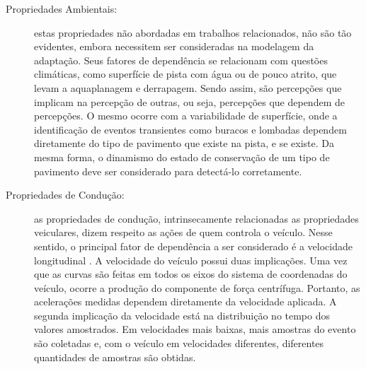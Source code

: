 \begin{description}
	\item [Propriedades Ambientais:] estas propriedades não abordadas em trabalhos relacionados, não são tão evidentes, embora necessitem ser consideradas na modelagem da adaptação. Seus fatores de dependência se relacionam com questões climáticas, como superfície de pista com água ou de pouco atrito, que levam a aquaplanagem e derrapagem. Sendo assim, são percepções que implicam na percepção de outras, ou seja, percepções que dependem de percepções. O mesmo ocorre com a variabilidade de superfície, onde a identificação de eventos transientes como buracos e lombadas dependem diretamente do tipo de pavimento que existe na pista, e se existe. Da mesma forma, o dinamismo do estado de conservação de um tipo de pavimento deve ser considerado para detectá-lo corretamente.

	\item [Propriedades de Condução:] as propriedades de condução, intrinsecamente relacionadas as propriedades veiculares, dizem respeito as ações de quem controla o veículo. Nesse sentido, o principal fator de dependência a ser considerado é a velocidade longitudinal \cite{Brunauer2016, Douangphachanh2013, Gueta2017, Kumar2017, Lima2016, M.2017, Nalavde2015, Singh2017}. A velocidade do veículo possui duas implicações. Uma vez que as curvas são feitas em todos os eixos do sistema de coordenadas do veículo, ocorre a produção do componente de força centrífuga. Portanto, as acelerações medidas dependem diretamente da velocidade aplicada. A segunda implicação da velocidade está na distribuição no tempo dos valores amostrados. Em velocidades mais baixas, mais amostras do evento são coletadas e, com o veículo em velocidades diferentes, diferentes quantidades de amostras são obtidas.

\end{description}



